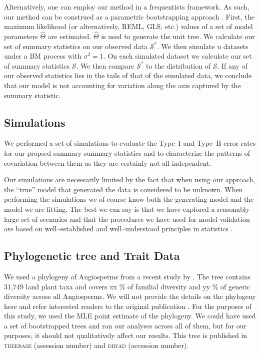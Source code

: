 \documentclass[12pt]{article}
\begin{document}
Alternatively, one can employ our method in a frequentists framework. As such, our method can be construed as a parametric bootstrapping approach \citep{Efronbootstrap}. First, the maximum likelihood (or alternatively, REML, GLS, etc.) values of a set of model parameters $\hat{\Theta}$ are estimated. $\hat{\Theta}$ is used to  generate the unit tree. We calculate our set of summary statistics on our observed data $\mathcal{S}^*$. We then simulate \textit{n} datasets under a BM process with $\sigma^2 = 1$. On each simulated dataset we calculate our set of summary statistics $\mathcal{S}$. We then compare $\mathcal{S}^*$ to the distribution of $\mathcal{S}$. If any of our observed statistics lies in the tails of that of the simulated data, we conclude that our model is not accounting for variation along the axis captured by the summary statistic.


\subsection*{Simulations}

We performed a set of simulations to evaluate the Type--I and Type--II error rates for our propsed summary summary statistics and to characterize the patterns of covariation between them as they are certainly not all independent.

Our simulations are necessarily limited by the fact that when using our approach, the ``true'' model that generated the data is considered to be unknown. When performing the simulations we of course know both the generating model and the model we are fitting. The best we can say is that we have explored a reasonably large set of scenarios and that the procedures we have used for model validation are based on well--established and well--understood principles in statistics \citep[especially Bayesian statistics; e.g.][]{Gelmanbook}.


\subsection*{Phylogenetic tree and Trait Data}
We used a phylogeny of Angiosperms from a recent study by \citet{Zanne2013}. The tree contains 31,749 land plant taxa and covers xx \% of familial diversity and yy \% of generic diversity across all Angiosperms. We will not provide the details on the phylogeny here and refer interested readers to the original publication \citep{Zanne2013}. For the purposes of this study, we used the MLE point estimate of the phylogeny. We could have used a set of bootstrapped trees and ran our analyses across all of them, but for our purposes, it should not qualitatively affect our results. This tree is published in \textsc{treebase} (assession number) and \textsc{dryad} (accession number).
\end{document}
